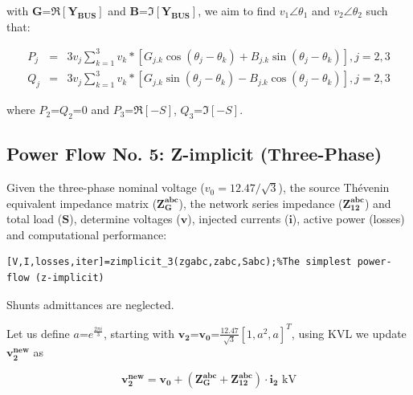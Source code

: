 \documentclass[12pt]{article}
\begin{document}
with $\mathbf{G}$=$\Re [\mathbf{Y_{BUS}}]$ and $\mathbf{B}$=$\Im [\mathbf{Y_{BUS}}]$, we aim to find   ${v}_1\angle \theta_1$ and  ${v}_2\angle \theta_2$ such that:

\begin{eqnarray}\label{2}
  P_j&=&3v_j \sum_{k=1}^3 v_k*[G_{j.k}\cos(\theta_j-\theta_k)+B_{j.k}\sin(\theta_j-\theta_k)], j=2,3\\\label{3}
    Q_j&=&3v_j \sum_{k=1}^3 v_k*[G_{j.k}\sin(\theta_j-\theta_k)-B_{j.k}\cos(\theta_j-\theta_k)], j=2,3
\end{eqnarray}

where $P_2$=$Q_2$=0 and  $P_3$=$\Re [-{S}]$, $Q_3$=$\Im [-{S}]$.

\subsection{Power Flow No. 5: Z-implicit (Three-Phase)}

Given the three-phase nominal voltage ($v_0=12.47/\sqrt{3}$), the source Th\'evenin equivalent impedance matrix ($\mathbf{{Z}^{abc}_{G}}$), the network series impedance ($\mathbf{{Z}^{abc}_{12}}$) and total load ($\bm{S}$),
determine voltages ($\bm{v}$), injected currents ($\mathbf{i}$), active power (losses) and computational performance:

\begin{verbatim}
[V,I,losses,iter]=zimplicit_3(zgabc,zabc,Sabc);%The simplest power-flow (z-implicit)
\end{verbatim}

Shunts admittances are neglected.

\begin{figure}[hbt]
\end{figure}
\newpage

Let us define $a$=$e^{\frac{2 \pi i}{3}}$, starting with $\bm{v_2}$=$\bm{v_0}$=$\frac{12.47}{\sqrt{3}}[1, a^2, a]^T$, using KVL we update $\bm{v^{new}_2}$ as

\begin{equation}
  \bm{v^{new}_2}=\bm{v_0}+(\mathbf{{Z}^{abc}_{G}}+\mathbf{{Z}^{abc}_{12}})\cdot \bm{i_2}\mbox{ kV}
\end{equation}
\end{document}
